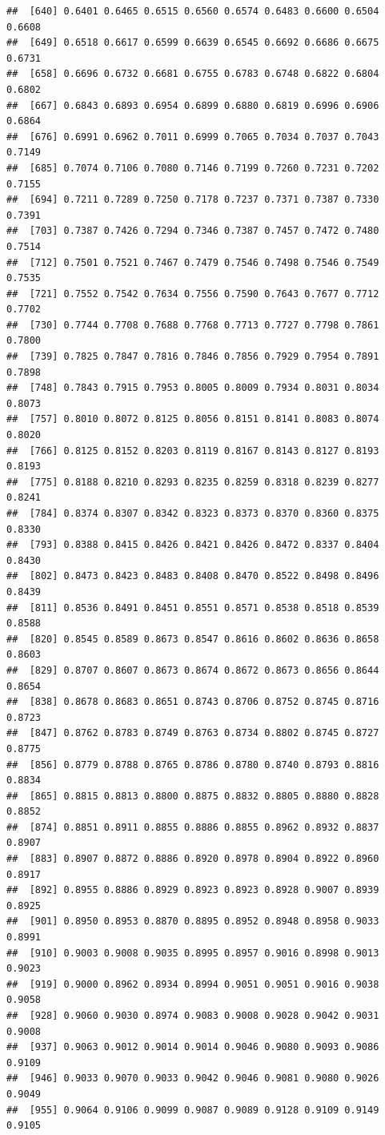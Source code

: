 \documentclass[]{article}
\begin{document}
\begin{verbatim}
##  [640] 0.6401 0.6465 0.6515 0.6560 0.6574 0.6483 0.6600 0.6504 0.6608
##  [649] 0.6518 0.6617 0.6599 0.6639 0.6545 0.6692 0.6686 0.6675 0.6731
##  [658] 0.6696 0.6732 0.6681 0.6755 0.6783 0.6748 0.6822 0.6804 0.6802
##  [667] 0.6843 0.6893 0.6954 0.6899 0.6880 0.6819 0.6996 0.6906 0.6864
##  [676] 0.6991 0.6962 0.7011 0.6999 0.7065 0.7034 0.7037 0.7043 0.7149
##  [685] 0.7074 0.7106 0.7080 0.7146 0.7199 0.7260 0.7231 0.7202 0.7155
##  [694] 0.7211 0.7289 0.7250 0.7178 0.7237 0.7371 0.7387 0.7330 0.7391
##  [703] 0.7387 0.7426 0.7294 0.7346 0.7387 0.7457 0.7472 0.7480 0.7514
##  [712] 0.7501 0.7521 0.7467 0.7479 0.7546 0.7498 0.7546 0.7549 0.7535
##  [721] 0.7552 0.7542 0.7634 0.7556 0.7590 0.7643 0.7677 0.7712 0.7702
##  [730] 0.7744 0.7708 0.7688 0.7768 0.7713 0.7727 0.7798 0.7861 0.7800
##  [739] 0.7825 0.7847 0.7816 0.7846 0.7856 0.7929 0.7954 0.7891 0.7898
##  [748] 0.7843 0.7915 0.7953 0.8005 0.8009 0.7934 0.8031 0.8034 0.8073
##  [757] 0.8010 0.8072 0.8125 0.8056 0.8151 0.8141 0.8083 0.8074 0.8020
##  [766] 0.8125 0.8152 0.8203 0.8119 0.8167 0.8143 0.8127 0.8193 0.8193
##  [775] 0.8188 0.8210 0.8293 0.8235 0.8259 0.8318 0.8239 0.8277 0.8241
##  [784] 0.8374 0.8307 0.8342 0.8323 0.8373 0.8370 0.8360 0.8375 0.8330
##  [793] 0.8388 0.8415 0.8426 0.8421 0.8426 0.8472 0.8337 0.8404 0.8430
##  [802] 0.8473 0.8423 0.8483 0.8408 0.8470 0.8522 0.8498 0.8496 0.8439
##  [811] 0.8536 0.8491 0.8451 0.8551 0.8571 0.8538 0.8518 0.8539 0.8588
##  [820] 0.8545 0.8589 0.8673 0.8547 0.8616 0.8602 0.8636 0.8658 0.8603
##  [829] 0.8707 0.8607 0.8673 0.8674 0.8672 0.8673 0.8656 0.8644 0.8654
##  [838] 0.8678 0.8683 0.8651 0.8743 0.8706 0.8752 0.8745 0.8716 0.8723
##  [847] 0.8762 0.8783 0.8749 0.8763 0.8734 0.8802 0.8745 0.8727 0.8775
##  [856] 0.8779 0.8788 0.8765 0.8786 0.8780 0.8740 0.8793 0.8816 0.8834
##  [865] 0.8815 0.8813 0.8800 0.8875 0.8832 0.8805 0.8880 0.8828 0.8852
##  [874] 0.8851 0.8911 0.8855 0.8886 0.8855 0.8962 0.8932 0.8837 0.8907
##  [883] 0.8907 0.8872 0.8886 0.8920 0.8978 0.8904 0.8922 0.8960 0.8917
##  [892] 0.8955 0.8886 0.8929 0.8923 0.8923 0.8928 0.9007 0.8939 0.8925
##  [901] 0.8950 0.8953 0.8870 0.8895 0.8952 0.8948 0.8958 0.9033 0.8991
##  [910] 0.9003 0.9008 0.9035 0.8995 0.8957 0.9016 0.8998 0.9013 0.9023
##  [919] 0.9000 0.8962 0.8934 0.8994 0.9051 0.9051 0.9016 0.9038 0.9058
##  [928] 0.9060 0.9030 0.8974 0.9083 0.9008 0.9028 0.9042 0.9031 0.9008
##  [937] 0.9063 0.9012 0.9014 0.9014 0.9046 0.9080 0.9093 0.9086 0.9109
##  [946] 0.9033 0.9070 0.9033 0.9042 0.9046 0.9081 0.9080 0.9026 0.9049
##  [955] 0.9064 0.9106 0.9099 0.9087 0.9089 0.9128 0.9109 0.9149 0.9105

\end{verbatim}
\end{document}

